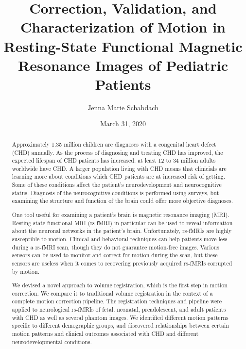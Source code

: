 \documentclass[pdflatex,final]{pittetd}%
\title[Correction, Validation, and Characterization of Motion in Resting-State Functional Magnetic Resonance Images of Pediatric Patients]{Correction, Validation, and Characterization of Motion in Resting-State Functional Magnetic Resonance Images of Pediatric Patients}
\author{Jenna Marie Schabdach}
\date{March 31, 2020}%
\begin{document}
  
\maketitle
%

\makecommittee

\copyrightpage                     

\begin{abstract}
Approximately 1.35 million children are diagnoses with a congenital heart defect (CHD) annually. As the process of diagnosing and treating CHD has improved, the expected lifespan of CHD patients has increased: at least 12 to 34 million adults worldwide have CHD. A larger population living with CHD means that clinicials are learning more about conditions which CHD patients are at increased risk of getting. Some of these conditions affect the patient's neurodevelopment and neurocognitive status. Diagnosis of the neurocognitive conditions is performed using surveys, but examining the structure and function of the brain could offer more objective diagnoses. 

One tool useful for examining a patient's brain is magnetic resonance imaging (MRI). Resting state functional MRI (rs-fMRI) in particular can be used to reveal information about the neuronal networks in the patient's brain. Unfortunately, rs-fMRIs are highly susceptible to motion. Clinical and behavioral techniques can help patients move less during a rs-fMRI scan, though they do not guarantee motion-free images. Various sensors can be used to monitor and correct for motion during the scan, but these sensors are useless when it comes to recovering previously acquired rs-fMRIs corrupted by motion.

We devised a novel approach to volume registration, which is the first step in motion correction. We compare it to traditional volume registration in the context of a complete motion correction pipeline. The registration techniques and pipeline were applied to neurological rs-fMRIs of fetal, neonatal, preadolescent, and adult patients with CHD as well as several phantom images. We identified different motion patterns specific to different demographic groups, and discovered relationships between certain motion patterns and clinical outcomes associated with CHD and different neurodevelopmental conditions.
\end{abstract}
\end{document}
